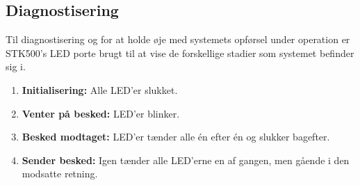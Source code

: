 \subsection{Diagnostisering}
Til diagnostisering og for at holde øje med systemets opførsel under operation er STK500's LED porte brugt til at vise de forskellige stadier som systemet befinder sig i.

\begin{enumerate}
	\item \textbf{Initialisering:} Alle LED'er slukket.
	\item \textbf{Venter på besked:} LED'er blinker.
	\item \textbf{Besked modtaget:} LED'er tænder alle én efter én og slukker bagefter.
	\item \textbf{Sender besked:} Igen tænder alle LED'erne en af gangen, men gående i den modsatte retning.
\end{enumerate}
